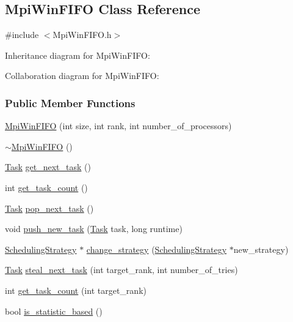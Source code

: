 \hypertarget{a00029}{}\subsection{Mpi\+Win\+F\+I\+F\+O Class Reference}
\label{a00029}


{\ttfamily \#include $<$Mpi\+Win\+F\+I\+F\+O.\+h$>$}



Inheritance diagram for Mpi\+Win\+F\+I\+F\+O\+:


Collaboration diagram for Mpi\+Win\+F\+I\+F\+O\+:
\subsubsection*{Public Member Functions}
\begin{DoxyCompactItemize}
\item 
\hyperlink{a00029_a52b5238edee8c348afbf0d370c81d8ce}{Mpi\+Win\+F\+I\+F\+O} (int size, int rank, int number\+\_\+of\+\_\+processors)
\item 
\hyperlink{a00029_a6ca0a6e127618d262ae40d3171bbb672}{$\sim$\+Mpi\+Win\+F\+I\+F\+O} ()
\item 
\hyperlink{a00002}{Task} \hyperlink{a00029_aeffee53a08818badfafed7642a41b955}{get\+\_\+next\+\_\+task} ()
\item 
int \hyperlink{a00029_a609d1de2a9afc8d82dfab9746fe7c885}{get\+\_\+task\+\_\+count} ()
\item 
\hyperlink{a00002}{Task} \hyperlink{a00029_a1ceb2f48f1ae2fbbf14ab9227ba8df9e}{pop\+\_\+next\+\_\+task} ()
\item 
void \hyperlink{a00029_ab250777bda97e37530c354683a87e8b4}{push\+\_\+new\+\_\+task} (\hyperlink{a00002}{Task} task, long runtime)
\item 
\hyperlink{a00033}{Scheduling\+Strategy} $\ast$ \hyperlink{a00029_ae5620542c597abff58986506d595c29e}{change\+\_\+strategy} (\hyperlink{a00033}{Scheduling\+Strategy} $\ast$new\+\_\+strategy)
\item 
\hyperlink{a00002}{Task} \hyperlink{a00029_a8f4af1f3c3f90b939f3638bf321be3bf}{steal\+\_\+next\+\_\+task} (int target\+\_\+rank, int number\+\_\+of\+\_\+tries)
\item 
int \hyperlink{a00029_a7481a465167e95e3993251106fe40cb3}{get\+\_\+task\+\_\+count} (int target\+\_\+rank)
\item 
bool \hyperlink{a00029_ab568b8ec6f8eb9baabaae8552a938204}{is\+\_\+statistic\+\_\+based} ()
\end{DoxyCompactItemize}
